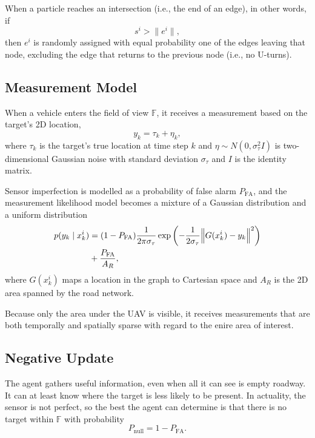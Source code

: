 \documentclass[letterpaper, 10 pt, conference]{ieeeconf}  %
\begin{document}
When a particle reaches an intersection (i.e., the end of an edge), in other words, if
\begin{equation}%
    s^i > \lVert e^i \rVert,
\end{equation}
then $e^i$ is randomly assigned with equal probability one of the edges leaving that node, excluding the edge that returns to the previous node (i.e., no U-turns).

\subsection{Measurement Model}

When a vehicle enters the field of view $\mathbb{F}$, it receives a measurement based on the target's 2D location,
\begin{equation}%
    y_k = \tau_k + \eta_k,
\end{equation}
where $\tau_k$ is the target's true location at time step $k$ and $\eta \sim N(0, \sigma_\tau^2 I)$ is two-dimensional Gaussian noise with standard deviation $\sigma_\tau$ and $I$ is the identity matrix.

Sensor imperfection is modelled as a probability of false alarm $P_{\text{FA}}$, and the measurement likelihood model becomes a mixture of a Gaussian distribution and a uniform distribution
\begin{align} \label{eq:measurement_model}
    p(y_k \mid x^i_k) &= (1 - P_{\text{FA}})\frac{1}{2\pi \sigma_\tau}\exp \left(-\frac{1}{2 \sigma_\tau} \norm{ G(x^i_k) - y_k }^2\right) \nonumber \\
    &+ \frac{P_{\text{FA}}}{A_R},
\end{align}
where $G(x^i_k)$ maps a location in the graph to Cartesian space and $A_R$ is the 2D area spanned by the road network.

Because only the area under the UAV is visible, it receives measurements that are both temporally and spatially sparse with regard to the enire area of interest.

\subsection{Negative Update}

The agent gathers useful information, even when all it can see is empty roadway. It can at least know where the target is less likely to be present. In actuality, the sensor is not perfect, so the best the agent can determine is that there is no target within $\mathbb{F}$ with probability
\begin{equation}%
    P_{\text{null}} = 1-P_{\text{FA}}.
\end{equation}
\end{document}
